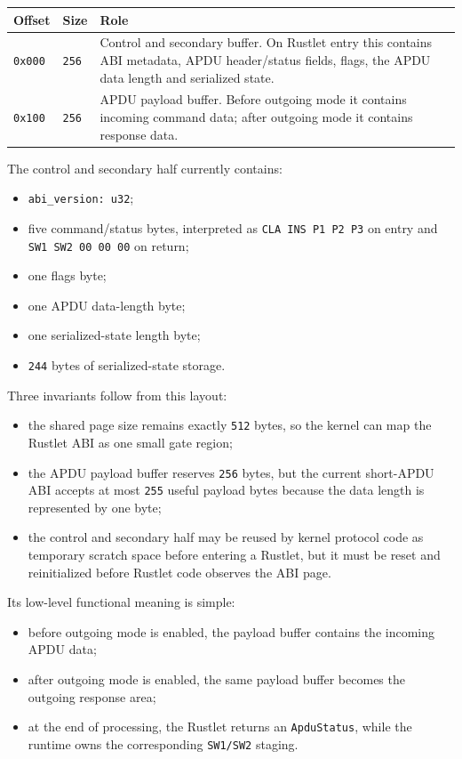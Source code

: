 \begin{center}
\begin{tabular}{|l|l|p{7.0cm}|}
\hline
\textbf{Offset} & \textbf{Size} & \textbf{Role} \\
\hline
\texttt{0x000} & \texttt{256} &
Control and secondary buffer. On Rustlet entry this contains ABI metadata,
APDU header/status fields, flags, the APDU data length and serialized state. \\
\hline
\texttt{0x100} & \texttt{256} &
APDU payload buffer. Before outgoing mode it contains incoming command data;
after outgoing mode it contains response data. \\
\hline
\end{tabular}
\end{center}

The control and secondary half currently contains:
\begin{itemize}
\item \texttt{abi\_version: u32};
\item five command/status bytes, interpreted as
  \texttt{CLA INS P1 P2 P3} on entry and \texttt{SW1 SW2 00 00 00} on return;
\item one flags byte;
\item one APDU data-length byte;
\item one serialized-state length byte;
\item \texttt{244} bytes of serialized-state storage.
\end{itemize}

Three invariants follow from this layout:
\begin{itemize}
\item the shared page size remains exactly \texttt{512} bytes, so the kernel
  can map the Rustlet ABI as one small gate region;
\item the APDU payload buffer reserves \texttt{256} bytes, but the current
  short-APDU ABI accepts at most \texttt{255} useful payload bytes because the
  data length is represented by one byte;
\item the control and secondary half may be reused by kernel protocol code as
  temporary scratch space before entering a Rustlet, but it must be reset and
  reinitialized before Rustlet code observes the ABI page.
\end{itemize}

Its low-level functional meaning is simple:
\begin{itemize}
\item before outgoing mode is enabled, the payload buffer contains the
  incoming APDU data;
\item after outgoing mode is enabled, the same payload buffer becomes
  the outgoing response area;
\item at the end of processing, the Rustlet returns an
  \texttt{ApduStatus}, while the runtime owns the corresponding
  \texttt{SW1/SW2} staging.
\end{itemize}


